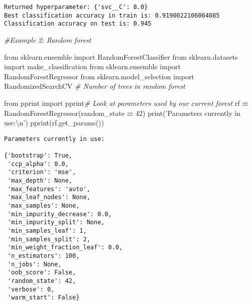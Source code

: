 \documentclass[10pt,a4paper]{article}
\newenvironment{Shaded}{\begin{snugshade}}{\end{snugshade}}
\newcommand{\BuiltInTok}[1]{#1}
\newcommand{\CharTok}[1]{\textcolor[rgb]{0.31,0.60,0.02}{#1}}
\newcommand{\CommentTok}[1]{\textcolor[rgb]{0.56,0.35,0.01}{\textit{#1}}}
\newcommand{\DecValTok}[1]{\textcolor[rgb]{0.00,0.00,0.81}{#1}}
\newcommand{\ImportTok}[1]{#1}
\newcommand{\NormalTok}[1]{#1}
\newcommand{\OperatorTok}[1]{\textcolor[rgb]{0.81,0.36,0.00}{\textbf{#1}}}
\newcommand{\StringTok}[1]{\textcolor[rgb]{0.31,0.60,0.02}{#1}}
\theoremstyle{break}
\begin{document}
\begin{verbatim}
Returned hyperparameter: {'svc__C': 8.0}
Best classification accuracy in train is: 0.9190022106064085
Classification accuracy on test is: 0.945
\end{verbatim}

\begin{Shaded}
\begin{Highlighting}[]
\CommentTok{#Example 2: Random forest}

\ImportTok{from}\NormalTok{ sklearn.ensemble }\ImportTok{import}\NormalTok{ RandomForestClassifier}
\ImportTok{from}\NormalTok{ sklearn.datasets }\ImportTok{import}\NormalTok{ make_classification}
\ImportTok{from}\NormalTok{ sklearn.ensemble }\ImportTok{import}\NormalTok{ RandomForestRegressor}
\ImportTok{from}\NormalTok{ sklearn.model_selection }\ImportTok{import}\NormalTok{ RandomizedSearchCV }\CommentTok{# Number of trees in random forest}

\ImportTok{from}\NormalTok{ pprint }\ImportTok{import}\NormalTok{ pprint}\CommentTok{# Look at parameters used by our current forest}
\NormalTok{rf }\OperatorTok{=}\NormalTok{ RandomForestRegressor(random_state }\OperatorTok{=} \DecValTok{42}\NormalTok{)}
\BuiltInTok{print}\NormalTok{(}\StringTok{'Parameters currently in use:}\CharTok{\textbackslash{}n}\StringTok{'}\NormalTok{)}
\NormalTok{pprint(rf.get_params())}
\end{Highlighting}
\end{Shaded}

\begin{verbatim}
Parameters currently in use:

{'bootstrap': True,
 'ccp_alpha': 0.0,
 'criterion': 'mse',
 'max_depth': None,
 'max_features': 'auto',
 'max_leaf_nodes': None,
 'max_samples': None,
 'min_impurity_decrease': 0.0,
 'min_impurity_split': None,
 'min_samples_leaf': 1,
 'min_samples_split': 2,
 'min_weight_fraction_leaf': 0.0,
 'n_estimators': 100,
 'n_jobs': None,
 'oob_score': False,
 'random_state': 42,
 'verbose': 0,
 'warm_start': False}
\end{verbatim}
\end{document}
